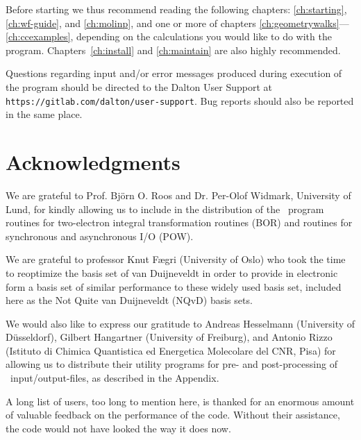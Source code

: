 Before starting we thus recommend reading
the following chapters: \ref{ch:starting}, \ref{ch:wf-guide}, and
\ref{ch:molinp}, and one or more of chapters
\ref{ch:geometrywalks}---\ref{ch:ccexamples}, depending on the
calculations you would like to do with the
program. Chapters~\ref{ch:install} and \ref{ch:maintain} are also
highly recommended.

Questions regarding input and/or error messages produced during execution of the program
should be directed to the Dalton User Support at \verb|https://gitlab.com/dalton/user-support|.
Bug reports should also be reported in the same place.

\section{Acknowledgments}

We are grateful to Prof. Bj\"{o}rn O. Roos and Dr. Per-Olof
Widmark, University of Lund, for kindly allowing us to include in
the distribution of the \dalton\ program routines for
two-electron integral transformation routines
(BOR) and routines for synchronous and asynchronous I/O (POW).

We are grateful to professor Knut F\ae gri (University of Oslo) who
took the time to reoptimize the basis set of van Duijneveldt in order
to provide in electronic form a basis set of similar performance to
these widely used basis set, included here as the Not Quite van
Duijneveldt (NQvD) basis sets.

We would also like to express our gratitude to Andreas Hesselmann
(University of D\"{u}sseldorf), Gilbert Hangartner (University of
Freiburg), and Antonio
Rizzo (Istituto di Chimica Quantistica ed Energetica Molecolare del
CNR, Pisa) for allowing us to distribute their utility programs for
pre- and post-processing of \dalton\ input/output-files, as described
in the Appendix.

A long list of users, too long to mention here, is thanked for an
enormous amount of valuable feedback on the performance of the
code. Without their assistance, the code would not have looked the
way it does now.
